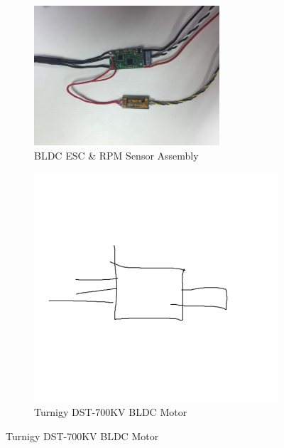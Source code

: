 \begin{figure}[htbp]
\centering
\begin{subfigure}{0.49\textwidth}
\includegraphics[width=\textwidth]{figs/motor-esc}
\caption{BLDC ESC \& RPM Sensor Assembly}
\label{fig:bldc-esc}
\end{subfigure}
\begin{subfigure}{0.49\textwidth}
\includegraphics[width=\textwidth]{figs/motor-bldc}
\caption{Turnigy DST-700KV BLDC Motor}
\label{fig:bldc-motor}
\end{subfigure}
\end{figure}

